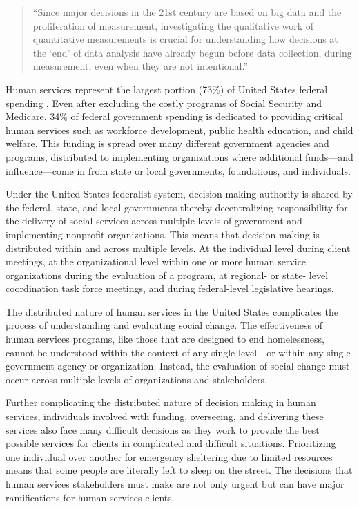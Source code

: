 \begin{quote}\singlespacing“Since major decisions in the 21st century are based on big data and the proliferation of measurement, investigating the qualitative work of quantitative measurements is crucial for understanding how decisions at the ‘end’ of data analysis have already begun before data collection, during measurement, even when they are not intentional.” \citep{Pine2015Politics} \end{quote}

Human services represent the largest portion (73\%) of United States federal spending \citep{Desilver2017Fed}. Even after excluding the costly programs of Social Security and Medicare, 34\% of federal government spending is dedicated to providing critical human services such as workforce development, public health education, and child welfare. This funding is spread over many different government agencies and programs, distributed to implementing organizations where additional funds---and influence---come in from state or local governments, foundations, and individuals. 

Under the United States federalist system, decision making authority is shared by the federal, state, and local governments \citep{Salamon2002Governance} thereby decentralizing responsibility for the delivery of social services across multiple levels of government and implementing nonprofit organizations. This means that decision making is distributed within and across multiple levels. At the individual level during client meetings, at the organizational level within one or more human service organizations during the evaluation of a program, at regional- or state- level coordination task force meetings, and during federal-level legislative hearings.

The distributed nature of human services in the United States complicates the process of understanding and evaluating social change. The effectiveness of human services programs, like those that are designed to end homelessness, cannot be understood within the context of any single level---or within any single government agency or organization. Instead, the evaluation of social change must occur across multiple levels of organizations and stakeholders.

Further complicating the distributed nature of decision making in human services, individuals involved with funding, overseeing, and delivering these services also face many difficult decisions as they work to provide the best possible services for clients in complicated and difficult situations. Prioritizing one individual over another for emergency sheltering due to limited resources means that some people are literally left to sleep on the street. The decisions that human services stakeholders must make are not only urgent but can have major ramifications for human services clients.

